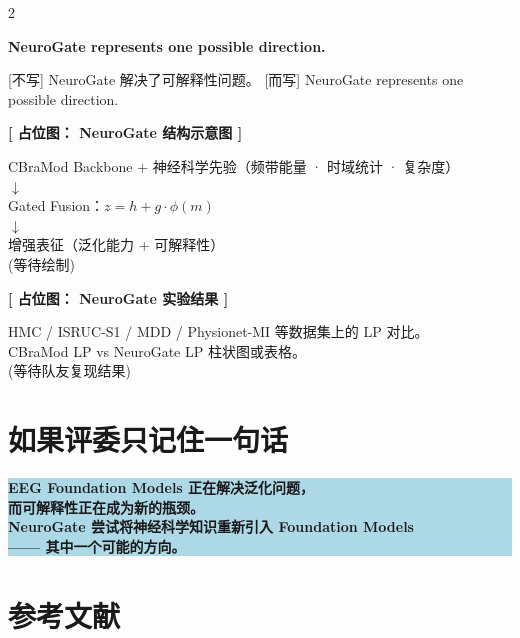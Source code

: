 \documentclass[12pt, a0paper]{article}
\renewcommand{\Large}{\fontsize{34}{42}\selectfont}
\renewcommand{\LARGE}{\fontsize{40}{48}\selectfont}
\renewcommand{\small}{\fontsize{18}{24}\selectfont}
\newcommand{\placeholder}[2]{%
    \begin{center}
    \colorbox{mygray!12}{\parbox{0.9\columnwidth}{%
        \centering
        \vspace{1.5em}
        {\Large\bfseries\color{mygray} [ 占位图： #1 ]}
        \vspace{1em}

        {\small\color{mygray} #2}
        \vspace{1.5em}
    }}
    \end{center}
}
\begin{document}
\begin{multicols}{2}
\begin{center}
\colorbox{mypurple!8}{\parbox{0.95\columnwidth}{\centering\bfseries
    NeuroGate represents one possible direction.}}
\end{center}

\vspace{1em}

{\small
\textcolor{myred}{[不写]} NeuroGate 解决了可解释性问题。\hspace{2em}
\textcolor{myblue}{[而写]} NeuroGate represents one possible direction.
}

\placeholder{NeuroGate 结构示意图}{%
    CBraMod Backbone \quad + \quad 神经科学先验（频带能量 · 时域统计 · 复杂度）\\
    $\downarrow$\\
    Gated Fusion：$z = h + g \cdot \phi(m)$\\
    $\downarrow$\\
    增强表征（泛化能力 + 可解释性）\\
    \small (等待绘制)}

\placeholder{NeuroGate 实验结果}{%
    HMC / ISRUC-S1 / MDD / Physionet-MI 等数据集上的 LP 对比。\\
    CBraMod LP vs NeuroGate LP 柱状图或表格。\\
    \small (等待队友复现结果)}

\section{如果评委只记住一句话}

\begin{center}
\colorbox{lightblue}{\parbox{0.95\columnwidth}{\centering\LARGE\bfseries
    EEG Foundation Models 正在解决泛化问题，\\
    而可解释性正在成为新的瓶颈。\\[5mm]
    \Large
    NeuroGate 尝试将神经科学知识重新引入 Foundation Models\\
    —— 其中一个可能的方向。}}
\end{center}

\vspace{2em}

\section*{参考文献}


\end{multicols}
\end{document}
